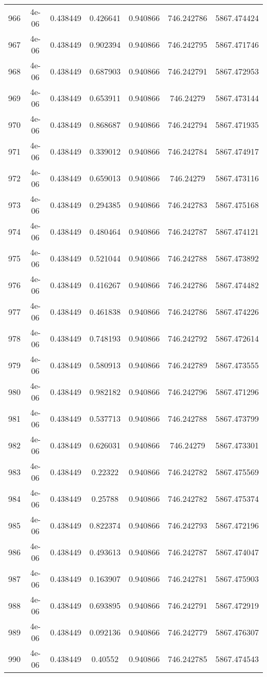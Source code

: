 \begin{table}
\begin{tabular*}{\linewidth}{c|c|c|c|c|c|c}
966 & 4e-06 & 0.438449 & 0.426641 & 0.940866 & 746.242786 & 5867.474424\\
967 & 4e-06 & 0.438449 & 0.902394 & 0.940866 & 746.242795 & 5867.471746\\
968 & 4e-06 & 0.438449 & 0.687903 & 0.940866 & 746.242791 & 5867.472953\\
969 & 4e-06 & 0.438449 & 0.653911 & 0.940866 & 746.24279 & 5867.473144\\
970 & 4e-06 & 0.438449 & 0.868687 & 0.940866 & 746.242794 & 5867.471935\\
971 & 4e-06 & 0.438449 & 0.339012 & 0.940866 & 746.242784 & 5867.474917\\
972 & 4e-06 & 0.438449 & 0.659013 & 0.940866 & 746.24279 & 5867.473116\\
973 & 4e-06 & 0.438449 & 0.294385 & 0.940866 & 746.242783 & 5867.475168\\
974 & 4e-06 & 0.438449 & 0.480464 & 0.940866 & 746.242787 & 5867.474121\\
975 & 4e-06 & 0.438449 & 0.521044 & 0.940866 & 746.242788 & 5867.473892\\
976 & 4e-06 & 0.438449 & 0.416267 & 0.940866 & 746.242786 & 5867.474482\\
977 & 4e-06 & 0.438449 & 0.461838 & 0.940866 & 746.242786 & 5867.474226\\
978 & 4e-06 & 0.438449 & 0.748193 & 0.940866 & 746.242792 & 5867.472614\\
979 & 4e-06 & 0.438449 & 0.580913 & 0.940866 & 746.242789 & 5867.473555\\
980 & 4e-06 & 0.438449 & 0.982182 & 0.940866 & 746.242796 & 5867.471296\\
981 & 4e-06 & 0.438449 & 0.537713 & 0.940866 & 746.242788 & 5867.473799\\
982 & 4e-06 & 0.438449 & 0.626031 & 0.940866 & 746.24279 & 5867.473301\\
983 & 4e-06 & 0.438449 & 0.22322 & 0.940866 & 746.242782 & 5867.475569\\
984 & 4e-06 & 0.438449 & 0.25788 & 0.940866 & 746.242782 & 5867.475374\\
985 & 4e-06 & 0.438449 & 0.822374 & 0.940866 & 746.242793 & 5867.472196\\
986 & 4e-06 & 0.438449 & 0.493613 & 0.940866 & 746.242787 & 5867.474047\\
987 & 4e-06 & 0.438449 & 0.163907 & 0.940866 & 746.242781 & 5867.475903\\
988 & 4e-06 & 0.438449 & 0.693895 & 0.940866 & 746.242791 & 5867.472919\\
989 & 4e-06 & 0.438449 & 0.092136 & 0.940866 & 746.242779 & 5867.476307\\
990 & 4e-06 & 0.438449 & 0.40552 & 0.940866 & 746.242785 & 5867.474543\\
\end{tabular*}
\end{table}
